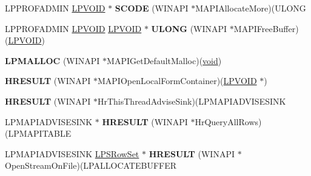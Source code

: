\begin{DoxyCompactItemize}
\item 
\mbox{\label{struct_m_a_p_i___f_u_n_c_t_i_o_n_s_aca185864e721e9d68ebdbad2bc4b49f3}} 
L\+P\+P\+R\+O\+F\+A\+D\+M\+IN \hyperlink{interfacevoid}{L\+P\+V\+O\+ID} $\ast$ {\bfseries S\+C\+O\+DE} (W\+I\+N\+A\+PI $\ast$M\+A\+P\+I\+Allocate\+More)(U\+L\+O\+NG
\item 
\mbox{\label{struct_m_a_p_i___f_u_n_c_t_i_o_n_s_a0f42ffc73801c9a7d64f409296f5fd28}} 
L\+P\+P\+R\+O\+F\+A\+D\+M\+IN \hyperlink{interfacevoid}{L\+P\+V\+O\+ID} \hyperlink{interfacevoid}{L\+P\+V\+O\+ID} $\ast$ {\bfseries U\+L\+O\+NG} (W\+I\+N\+A\+PI $\ast$M\+A\+P\+I\+Free\+Buffer)(\hyperlink{interfacevoid}{L\+P\+V\+O\+ID})
\item 
\mbox{\label{struct_m_a_p_i___f_u_n_c_t_i_o_n_s_ade41e67a99cdd6425bde4596c8dff308}} 
{\bfseries L\+P\+M\+A\+L\+L\+OC} (W\+I\+N\+A\+PI $\ast$M\+A\+P\+I\+Get\+Default\+Malloc)(\hyperlink{interfacevoid}{void})
\item 
\mbox{\label{struct_m_a_p_i___f_u_n_c_t_i_o_n_s_a352de262422fa1032411e61601a7c7f9}} 
{\bfseries H\+R\+E\+S\+U\+LT} (W\+I\+N\+A\+PI $\ast$M\+A\+P\+I\+Open\+Local\+Form\+Container)(\hyperlink{interfacevoid}{L\+P\+V\+O\+ID} $\ast$)
\item 
\mbox{\label{struct_m_a_p_i___f_u_n_c_t_i_o_n_s_adcf77e2e5646c9bf469ba779550fb88e}} 
{\bfseries H\+R\+E\+S\+U\+LT} (W\+I\+N\+A\+PI $\ast$Hr\+This\+Thread\+Advise\+Sink)(L\+P\+M\+A\+P\+I\+A\+D\+V\+I\+S\+E\+S\+I\+NK
\item 
\mbox{\label{struct_m_a_p_i___f_u_n_c_t_i_o_n_s_afadad9b4baf12a5cc92b45f270ad216c}} 
L\+P\+M\+A\+P\+I\+A\+D\+V\+I\+S\+E\+S\+I\+NK $\ast$ {\bfseries H\+R\+E\+S\+U\+LT} (W\+I\+N\+A\+PI $\ast$Hr\+Query\+All\+Rows)(L\+P\+M\+A\+P\+I\+T\+A\+B\+LE
\item 
\mbox{\label{struct_m_a_p_i___f_u_n_c_t_i_o_n_s_ae88a5e5e21bc056f1143df84e2163d27}} 
L\+P\+M\+A\+P\+I\+A\+D\+V\+I\+S\+E\+S\+I\+NK \hyperlink{struct___s_row_set}{L\+P\+S\+Row\+Set} $\ast$ {\bfseries H\+R\+E\+S\+U\+LT} (W\+I\+N\+A\+PI $\ast$Open\+Stream\+On\+File)(L\+P\+A\+L\+L\+O\+C\+A\+T\+E\+B\+U\+F\+F\+ER

\end{DoxyCompactItemize}
